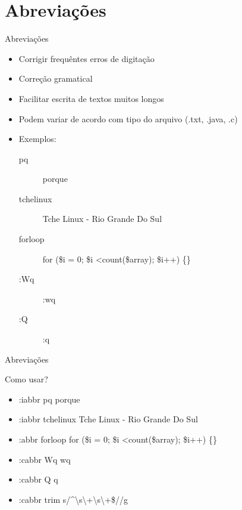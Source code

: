 \section{Abreviações}
\begin{frame}{Abreviações}
\begin{itemize}
	\item Corrigir frequêntes erros de digitação
	\item Correção gramatical
	\item Facilitar escrita de textos muitos longos
	\item Podem variar de acordo com tipo do arquivo (.txt, .java, .c)
	\item Exemplos:
	\begin{description}
		\item[pq] porque
		\item[tchelinux] Tche Linux - Rio Grande Do Sul
		\item[forloop] for (\$i = 0; \$i \textless count(\$array); \$i++) \{\}
		\item[:Wq] :wq
		\item[:Q] :q
	\end{description}
\end{itemize}
\end{frame}
\begin{frame}{Abreviações}
\begin{block}{Como usar?}
	\begin{itemize}
		\item :iabbr pq porque
		\item :iabbr tchelinux Tche Linux - Rio Grande Do Sul
		\item :abbr forloop for (\$i = 0; \$i \textless count(\$array); \$i++) \{\}
		\item :cabbr Wq wq
		\item :cabbr Q q
		\item{:cabbr trim s/\textasciicircum\textbackslash{}s\textbackslash{}+\textbar\textbackslash{}s\textbackslash{}+\$//g}
	\end{itemize}
\end{block}
\end{frame}

